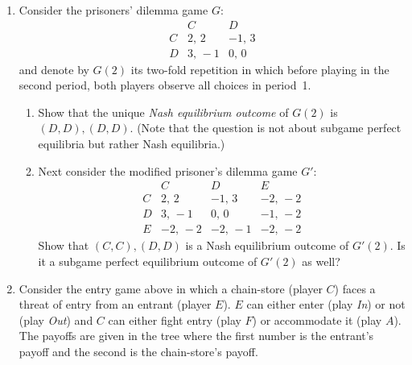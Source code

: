 \documentclass[11pt]{article}
\begin{document}
\begin{enumerate}[itemsep=1em]
  \item Consider the prisoners' dilemma game $G$:
    \[
    \begin{array}{c|cc}
       & C & D \\ \hline
       C & 2,\,2 & -1,\,3 \\
       D & 3,\,-1 & 0,\,0
    \end{array}
    \]
    and denote by $G(2)$ its two-fold repetition in which before playing in the second period, both players observe all choices in period~1.
    \begin{enumerate}[label=(\alph*), itemsep=0.4em, topsep=0.4em]
      \item Show that the unique \emph{Nash equilibrium outcome} of $G(2)$ is $(D, D), (D, D)$. (Note that the question is not about subgame perfect equilibria but rather Nash equilibria.)
      \item Next consider the modified prisoner's dilemma game $G'$:
      \[
      \begin{array}{c|ccc}
         & C & D & E \\ \hline
         C & 2,\,2 & -1,\,3 & -2,\,-2 \\
         D & 3,\,-1 & 0,\,0 & -1,\,-2 \\
         E & -2,\,-2 & -2,\,-1 & -2,\,-2
      \end{array}
      \]
      Show that $(C, C), (D, D)$ is a Nash equilibrium outcome of $G'(2)$. Is it a subgame perfect equilibrium outcome of $G'(2)$ as well?
    \end{enumerate}

  \item \begin{center}
    \end{center}
    Consider the entry game above in which a chain-store (player $C$) faces a threat of entry from an entrant (player $E$). $E$ can either enter (play \textit{In}) or not (play \textit{Out}) and $C$ can either fight entry (play $F$) or accommodate it (play $A$). The payoffs are given in the tree where the first number is the entrant's payoff and the second is the chain-store's payoff.


\end{enumerate}
\end{document}
